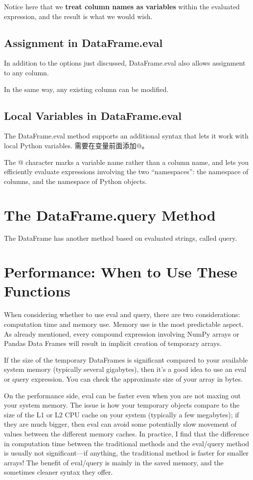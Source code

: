 Notice here that we \textbf{treat column names as variables} within the evaluated expression, and the result is what we would wish.

\subsection*{Assignment in DataFrame.eval}
In addition to the options just discussed, DataFrame.eval also allows assignment to
any column.

In the same way, any existing column can be modified.
\subsection*{Local Variables in DataFrame.eval}
The DataFrame.eval method supports an additional syntax that lets it work with
local Python variables. 需要在变量前面添加@。

The @ character marks a variable name rather than a column name, and lets you
efficiently evaluate expressions involving the two “namespaces”: the namespace of
columns, and the namespace of Python objects. 

\section{The DataFrame.query Method}
The DataFrame has another method based on evaluated strings, called query.

\section{Performance: When to Use These Functions}
When considering whether to use eval and query, there are two considerations: computation time and memory use. Memory use is the most predictable aspect. As already
mentioned, every compound expression involving NumPy arrays or Pandas Data
Frames will result in implicit creation of temporary arrays.

If the size of the temporary DataFrames is significant compared to your available system memory (typically several gigabytes), then it's a good idea to use an eval or
query expression. You can check the approximate size of your array in bytes.

On the performance side, eval can be faster even when you are not maxing out your
system memory. The issue is how your temporary objects compare to the size of the
L1 or L2 CPU cache on your system (typically a few megabytes); if they are much bigger, then eval can avoid some potentially slow movement of values between the different memory caches. In practice, I find that the difference in computation time
between the traditional methods and the eval/query method is usually not significant—if anything, the traditional method is faster for smaller arrays! The benefit of
eval/query is mainly in the saved memory, and the sometimes cleaner syntax they
offer.